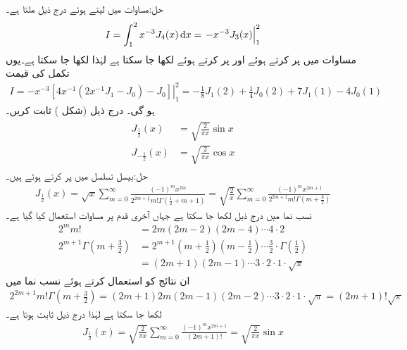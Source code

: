 حل:مساوات  میں  لیتے ہوئے  درج ذیل ملتا ہے۔
\begin{align*}
I=\int_{1}^{2} x^{-3}J_4(x)\dif x=\left. -x^{-3}J_3(x)\right|_{1}^{2}
\end{align*}
مساوات  میں  پر کرتے ہوئے  اور  پر کرتے ہوئے  لکھا جا سکتا ہے لہٰذا  لکھا جا سکتا ہے۔یوں تکمل کی قیمت
\begin{align*}
I=\left.  -x^{-3}[4x^{-1}(2x^{-1}J_1-J_0)-J_0] \right|_{1}^{2}=-\frac{1}{8}J_1(2)+\frac{1}{4}J_0(2)+7J_1(1)-4J_0(1)
\end{align*}
ہو گی۔
درج ذیل (شکل ) ثابت کریں۔
\begin{gather}
\begin{aligned} \label{مساوات_بیسل_تعلق_کوسائن}
J_{\frac{1}{2}}(x)&=\sqrt{\frac{2}{\pi x}}\sin x\\
J_{-\frac{1}{2}}(x)&=\sqrt{\frac{2}{\pi x}}\cos x
\end{aligned}
\end{gather}
حل:بیسل تسلسل  میں  پر کرتے ہوئے ہیں۔
\begin{align*}
J_{\frac{1}{2}}(x)=\sqrt{x}\sum_{m=0}^{\infty}\frac{(-1)^m x^{2m}}{2^{2m+\frac{1}{2}}m!\Gamma(\frac{1}{2}+m+1)}=\sqrt{\frac{2}{x}}\sum_{m=0}^{\infty}\frac{(-1)^m x^{2m+1}}{2^{2m+1}m!\Gamma(m+\frac{3}{2})}
\end{align*}
نسب نما میں درج ذیل لکھا جا سکتا ہے جہاں آخری قدم پر مساوات  استعمال کیا گیا ہے۔
\begin{align*}
2^mm!&=2m(2m-2)(2m-4)\cdots 4\cdot 2\\
2^{m+1}\Gamma(m+\tfrac{3}{2})&=2^{m+1}(m+\tfrac{1}{2})(m-\tfrac{1}{2})\cdots \tfrac{3}{2}\cdot \Gamma(\tfrac{1}{2})\\
&=(2m+1)(2m-1)\cdots 3\cdot 2\cdot 1\cdot \sqrt{\pi}
\end{align*}
ان نتائج کو استعمال کرتے ہوئے نسب نما میں
\begin{align*}
2^{2m+1}m!\Gamma(m+\tfrac{3}{2})=(2m+1)2m(2m-1)(2m-2)\cdots 3\cdot 2 \cdot 1\cdot \sqrt{\pi}=(2m+1)!\sqrt{\pi}
\end{align*}
لکھا جا سکتا ہے لہٰذا درج ذیل ثابت ہوتا ہے۔
\begin{align*}
J_{\frac{1}{2}}(x)=\sqrt{\frac{2}{\pi x}}\sum_{m=0}^{\infty}\frac{(-1)^m x^{2m+1}}{(2m+1)!}=\sqrt{\frac{2}{\pi x}}\sin x
\end{align*}
